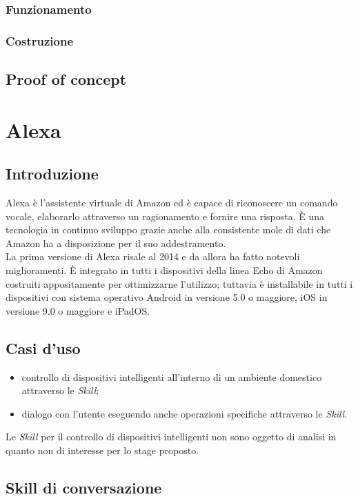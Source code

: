 		\subsubsection{Funzionamento}
		\subsubsection{Costruzione}
	\subsection{Proof of concept}	

\section{Alexa}
	\subsection{Introduzione}
	Alexa è l'assistente virtuale di Amazon ed è capace di riconoscere un comando vocale, elaborarlo attraverso un ragionamento e fornire una risposta. È una tecnologia in continuo sviluppo grazie anche alla consistente mole di dati che Amazon ha a disposizione per il suo addestramento. \\
	La prima versione di Alexa risale al 2014 e da allora ha fatto notevoli miglioramenti. È integrato in tutti i dispositivi della linea Echo di Amazon costruiti appositamente per ottimizzarne l'utilizzo; tuttavia è installabile in tutti i dispositivi con sistema operativo Android in versione 5.0 o maggiore, iOS in versione 9.0 o maggiore e iPadOS.
	\subsection{Casi d'uso}
	\begin{itemize}
		\item controllo di dispositivi intelligenti all'interno di un ambiente domestico attraverso le \textit{Skill};
		\item dialogo con l'utente eseguendo anche operazioni specifiche attraverso le \textit{Skill}.
	\end{itemize}
	Le \textit{Skill} per il controllo di dispositivi intelligenti non sono oggetto di analisi in quanto non di interesse per lo stage proposto.
	\subsection{Skill di conversazione}
